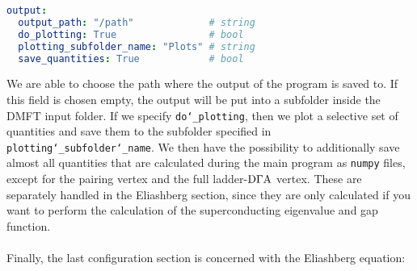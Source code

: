 \documentclass[../../main.tex]{subfiles}
\begin{document}
\begin{minipage}{\textwidth}%
\begin{lstlisting}[language=yaml]
output:
  output_path: "/path"             # string
  do_plotting: True                # bool
  plotting_subfolder_name: "Plots" # string
  save_quantities: True            # bool
\end{lstlisting}
\end{minipage}
We are able to choose the path where the output of the program is saved to. If this field is chosen empty, the output will be put into a subfolder inside the DMFT input folder. If we specify \texttt{do\char`_plotting}, then we plot a selective set of quantities and save them to the subfolder specified in \texttt{plotting\char`_subfolder\char`_name}. We then have the possibility to additionally save almost all quantities that are calculated during the main program as \texttt{numpy} files, except for the pairing vertex and the full ladder-$\text{D}\Gamma\text{A}$ vertex. These are separately handled in the Eliashberg section, since they are only calculated if you want to perform the calculation of the superconducting eigenvalue and gap function.
\\\\
Finally, the last configuration section is concerned with the Eliashberg equation:
\end{document}
